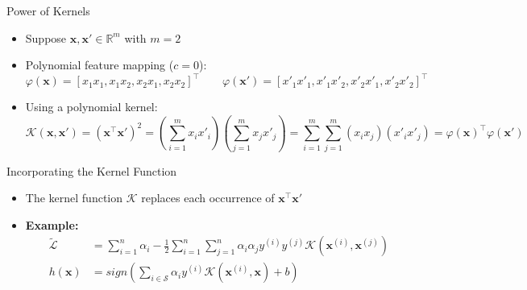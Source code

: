 \begin{frame}{Power of Kernels}{}
	\begin{itemize}
		\item Suppose $\bm{x}, \bm{x'} \in \mathbb{R}^m$ with $m = 2$
		\item Polynomial feature mapping ($c = 0$):
		\vspace*{-1.5mm}
		\begin{equation}
			\varphi(\bm{x}) = [x_1 x_1, x_1 x_2, x_2 x_1, x_2 x_2]^{\intercal} \qquad
			\varphi(\bm{x'}) = [x'_1 x'_1, x'_1 x'_2, x'_2 x'_1, x'_2 x'_2]^{\intercal}
		\end{equation}
		\item Using a polynomial kernel:
		{\scriptsize
		\begin{equation}
			\mathcal{K}(\bm{x}, \bm{x'}) 
				= (\bm{x}^{\intercal} \bm{x'})^2
				= \left( \sum_{i=1}^m x_i x'_i \right) \left( \sum_{j=1}^m x_j x'_j \right)
				= \sum_{i=1}^m \sum_{j=1}^m (x_i x_j) (x'_i x'_j) = \varphi(\bm{x})^{\intercal} \varphi(\bm{x'})
		\end{equation}}
		\vspace*{-4mm}
		\begin{boxBlueNoFrame}
			\footnotesize
		\end{boxBlueNoFrame}
	\end{itemize}
\end{frame}


\begin{frame}{Incorporating the Kernel Function}{}
	\begin{itemize}
		\item The kernel function $\mathcal{K}$ replaces each occurrence of $\bm{x}^{\intercal}\bm{x'}$
		\item \textbf{Example:}
		\begin{align}
			\widetilde{\mathcal{L}} 
					&= \sum_{i=1}^n \alpha_i  - \frac{1}{2} \sum_{i=1}^n \sum_{j=1}^n
						\alpha_i \alpha_j y^{(i)} y^{(j)} \mathcal{K}(\bm{x}^{(i)}, \bm{x}^{(j)}) \\[4mm]
			h(\bm{x}) 	&= sign\left( \sum_{i \in \mathcal{S}} \alpha_i y^{(i)} \mathcal{K}(\bm{x}^{(i)}, \bm{x}) + b \right)
		\end{align}
	\end{itemize}
\end{frame}



